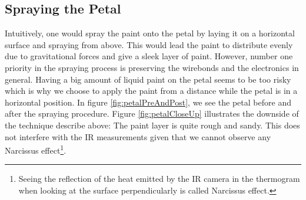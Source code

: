 \subsection{Spraying the Petal}
Intuitively, one would spray the paint onto the petal by laying it on a horizontal surface and spraying from above. This would lead the paint to distribute evenly due to gravitational forces and give a sleek layer of paint. However, number one priority in the spraying process is preserving the wirebonds and the electronics in general. Having a big amount of liquid paint on the petal seems to be too risky which is why we choose to apply the paint from a distance while the petal is in a horizontal position. In figure \ref{fig:petalPreAndPost}, we see the petal before and after the spraying procedure. Figure \ref{fig:petalCloseUp} illustrates the downside of the technique describe above: The paint layer is quite rough and sandy. This does not interfere with the IR measurements given that we cannot observe any Narcissus effect\footnote{Seeing the reflection of the heat emitted by the IR camera in the thermogram when looking at the surface perpendicularly is called Narcissus effect.}.
